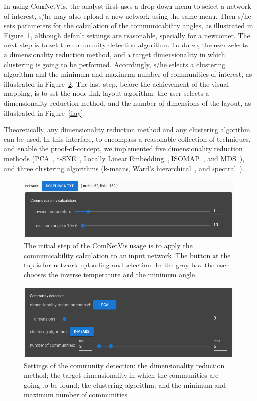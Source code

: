 \documentclass[Afour,sagev,times]{sagej}
\begin{document}
In using ComNetVis, the analyst first uses a drop-down menu to select
a network of interest, s/he may also upload a new network using the same menu.
Then s/he sets parameters for the calculation of the communicability angles, as illustrated in Figure~\ref{finitial}, although default settings are reasonable, specially for a newcomer.
The next step is to set the community detection algorithm.
To do so, the user selects a dimensionality reduction method, and a target dimensionality in which clustering is going to be performed.
Accordingly, s/he selects a clustering algorithm and the minimum and maximum number of communities of interest, as illustrated in Figure~\ref{fcom}.
The last step, before the achievement of the visual mapping,
is to set the node-link layout algorithm:
the user selects a dimensionality reduction method,
and the number of dimensions of the layout,
as illustrated in Figure~\ref{flay}.

Theoretically,
any dimensionality reduction method
and any clustering algorithm
can be used.
In this interface, to encompass a reasonable collection of techniques,
and enable the proof-of-concept,
we implemented five dimensionality reduction methods
(PCA~\cite{pca}, t-SNE~\cite{tsne}, Locally Linear Embedding~\cite{lle},
ISOMAP~\cite{isomap}, and MDS~\cite{mds}),
and three clustering algorithms (k-means,
Ward's hierarchical~\cite{ward}, and spectral~\cite{spectral}).



\begin{figure}\centering
 \includegraphics[width=\columnwidth]{figs/initial}
  \caption{The initial step of the ComNetVis usage is to apply the communicability calculation to an input network.
  The button at the top is for network uploading and selection.
  In the gray box the user chooses the inverse temperature and the minimum angle.
  }\label{finitial}
\end{figure}


\begin{figure}\centering
 \includegraphics[width=\columnwidth]{figs/com}
  \caption{
    Settings of the community detection: the dimensionality reduction method;
    the target dimensionality in which the communities are going to be found;
    the clustering algorithm;
    and the minimum and maximum number of communities.
  }\label{fcom}
\end{figure}
\end{document}
